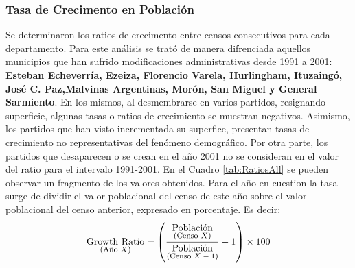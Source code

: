 \documentclass{article}
\theoremstyle{mytheoremstyle}
\theoremstyle{mytheoremstyle}
\theoremstyle{myproblemstyle}
\begin{document}
\subsubsection{Tasa de Crecimento en Población}
  Se determinaron los ratios de crecimento entre censos consecutivos para cada departamento.
  Para este análisis se trató de manera difrenciada aquellos municipios que han sufrido modificaciones administrativas
  desde 1991  a 2001: \textbf{Esteban Echeverría, Ezeiza, Florencio Varela, Hurlingham, Ituzaingó, José C. Paz,Malvinas Argentinas, 
Morón, San Miguel y General Sarmiento}. En los mismos, al desmembrarse en varios partidos, resignando superficie, algunas tasas o ratios de crecimiento 
  se muestran negativos. Asimismo, los partidos que han visto incrementada su superfice, presentan tasas de crecimiento no representativas del 
  fenómeno demográfico.\newline\newline
  Por otra parte, los partidos que desaparecen o se crean en el año 2001 no se consideran en el valor del ratio para el intervalo 1991-2001.\newline\newline
    En el Cuadro \ref{tab:RatiosAll} se pueden observar un fragmento de los valores obtenidos. Para el año en cuestion la tasa surge de dividir el valor poblacional
  del censo de este año sobre el valor poblacional del censo anterior, expresado en porcentaje.\newline\newline
  Es decir: 
  \begin{equation}
    \underset{\text{\footnotesize(Año $X$)}}{\text{Growth Ratio}} = 
    \left( \frac{\underset{\text{\footnotesize(Censo $X$)}}{\text{Población}}}{\underset{\text{\footnotesize(Censo $X-1$)}}{\text{Población}}} - 1 \right) \times 100
  \end{equation}
\end{document}
